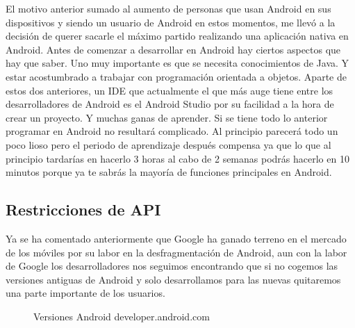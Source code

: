 El motivo anterior sumado al aumento de personas que usan Android en sus dispositivos y siendo un usuario de Android en estos momentos, me llevó a la decisión de querer sacarle el máximo partido realizando una aplicación nativa en Android.
Antes de comenzar a desarrollar en Android hay ciertos aspectos que hay que saber.
Uno muy importante es que se necesita conocimientos de Java.
Y estar acostumbrado a trabajar con programación orientada a objetos.
Aparte de estos dos anteriores, un IDE que actualmente el que más auge tiene entre los desarrolladores de Android es el Android Studio por su facilidad a la hora de crear un proyecto.
Y muchas ganas de aprender.
Si se tiene todo lo anterior programar en Android no resultará complicado. Al principio parecerá todo un poco lioso pero el periodo de aprendizaje después compensa ya que lo que al principio tardarías en hacerlo 3 horas al cabo de 2 semanas podrás hacerlo en 10 minutos porque ya te sabrás la mayoría de funciones principales en Android.


\subsection{Restricciones de API}
\label{subsecc:Restricciones de API}

Ya se ha comentado anteriormente que Google ha ganado terreno en el mercado de los móviles por su labor en la desfragmentación de Android, aun con la labor de Google los desarrolladores nos seguimos encontrando que si no cogemos las versiones antiguas de Android y solo desarrollamos para las nuevas quitaremos una parte importante de los usuarios.

\begin{figure}[H] 
  \begin{center} 
    \caption{Versiones Android developer.android.com} 
    \label{fig:VersionesAndroid2} 
  \end{center} 
\end{figure}

